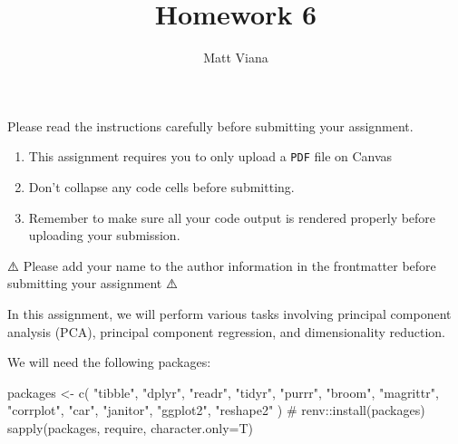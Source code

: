 \documentclass[
  letterpaper,
  DIV=11,
  numbers=noendperiod]{scrartcl}
\title{Homework 6}
\author{{Matt Viana}}
\date{}
\newenvironment{Shaded}{\begin{snugshade}}{\end{snugshade}}
\newcommand{\AttributeTok}[1]{\textcolor[rgb]{0.40,0.45,0.13}{#1}}
\newcommand{\CommentTok}[1]{\textcolor[rgb]{0.37,0.37,0.37}{#1}}
\newcommand{\FunctionTok}[1]{\textcolor[rgb]{0.28,0.35,0.67}{#1}}
\newcommand{\NormalTok}[1]{\textcolor[rgb]{0.00,0.23,0.31}{#1}}
\newcommand{\OtherTok}[1]{\textcolor[rgb]{0.00,0.23,0.31}{#1}}
\newcommand{\StringTok}[1]{\textcolor[rgb]{0.13,0.47,0.30}{#1}}
\providecommand{\tightlist}{%
  \setlength{\itemsep}{0pt}\setlength{\parskip}{0pt}}\usepackage{longtable,booktabs,array}
\renewcommand*\contentsname{Table of contents}
\newcommand\contentsname{Table of contents}
\begin{document}
\maketitle

\renewcommand*\contentsname{Table of contents}
{
\hypersetup{linkcolor=}
\setcounter{tocdepth}{3}
\tableofcontents
}
\begin{tcolorbox}[enhanced jigsaw, leftrule=.75mm, rightrule=.15mm, left=2mm, colframe=quarto-callout-important-color-frame, bottomtitle=1mm, colbacktitle=quarto-callout-important-color!10!white, titlerule=0mm, breakable, opacitybacktitle=0.6, coltitle=black, arc=.35mm, colback=white, title=\textcolor{quarto-callout-important-color}{\faExclamation}\hspace{0.5em}{Important}, toptitle=1mm, toprule=.15mm, bottomrule=.15mm, opacityback=0]

Please read the instructions carefully before submitting your
assignment.

\begin{enumerate}
\def\labelenumi{\arabic{enumi}.}
\tightlist
\item
  This assignment requires you to only upload a \texttt{PDF} file on
  Canvas
\item
  Don't collapse any code cells before submitting.
\item
  Remember to make sure all your code output is rendered properly before
  uploading your submission.
\end{enumerate}

⚠️ Please add your name to the author information in the frontmatter
before submitting your assignment ⚠️

\end{tcolorbox}

In this assignment, we will perform various tasks involving principal
component analysis (PCA), principal component regression, and
dimensionality reduction.

We will need the following packages:

\begin{Shaded}
\begin{Highlighting}[]
\NormalTok{packages }\OtherTok{\textless{}{-}} \FunctionTok{c}\NormalTok{(}
  \StringTok{"tibble"}\NormalTok{,}
  \StringTok{"dplyr"}\NormalTok{, }
  \StringTok{"readr"}\NormalTok{, }
  \StringTok{"tidyr"}\NormalTok{, }
  \StringTok{"purrr"}\NormalTok{, }
  \StringTok{"broom"}\NormalTok{,}
  \StringTok{"magrittr"}\NormalTok{,}
  \StringTok{"corrplot"}\NormalTok{,}
  \StringTok{"car"}\NormalTok{,}
  \StringTok{"janitor"}\NormalTok{,}
  \StringTok{"ggplot2"}\NormalTok{,}
  \StringTok{"reshape2"}
\NormalTok{)}
\CommentTok{\# renv::install(packages)}
\FunctionTok{sapply}\NormalTok{(packages, require, }\AttributeTok{character.only=}\NormalTok{T)}
\end{Highlighting}
\end{Shaded}
\end{document}
